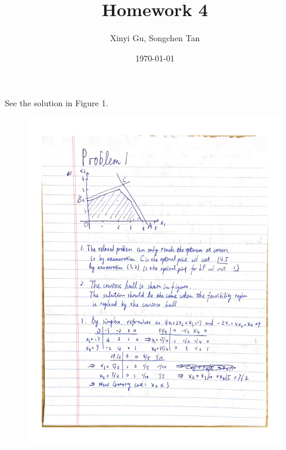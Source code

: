 \documentclass{article}
\title{Homework 4}
\author{Xinyi Gu, Songchen Tan}
\date{\today}
\begin{document}
\maketitle
\section{}
See the solution in Figure 1.
\begin{figure}[!ht]
    \includegraphics[width=\textwidth]{1.1.png}
\end{figure}
\end{document}
